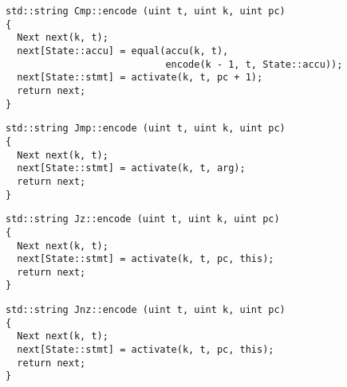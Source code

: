 
\begin{lstlisting}[style=c++, style=encode]
std::string Cmp::encode (uint t, uint k, uint pc)
{
  Next next(k, t);
  next[State::accu] = equal(accu(k, t),
                            encode(k - 1, t, State::accu));
  next[State::stmt] = activate(k, t, pc + 1);
  return next;
}
\end{lstlisting}


\begin{lstlisting}[style=c++, style=encode]
std::string Jmp::encode (uint t, uint k, uint pc)
{
  Next next(k, t);
  next[State::stmt] = activate(k, t, arg);
  return next;
}
\end{lstlisting}


\begin{lstlisting}[style=c++, style=encode]
std::string Jz::encode (uint t, uint k, uint pc)
{
  Next next(k, t);
  next[State::stmt] = activate(k, t, pc, this);
  return next;
}
\end{lstlisting}


\newpage

\begin{lstlisting}[style=c++, style=encode]
std::string Jnz::encode (uint t, uint k, uint pc)
{
  Next next(k, t);
  next[State::stmt] = activate(k, t, pc, this);
  return next;
}
\end{lstlisting}

